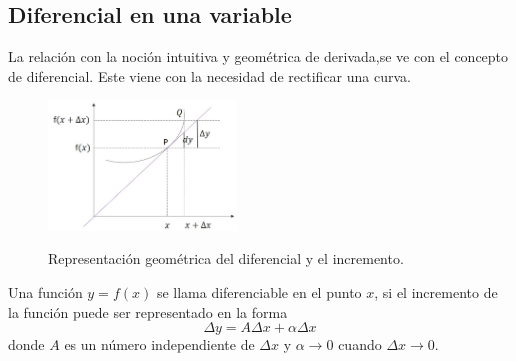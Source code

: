 \documentclass[10pt,twoside]{SelfArx} %
\begin{document}
 \subsection{Diferencial en una variable}
  La relación con la noción intuitiva y geométrica de derivada,se ve con el concepto de diferencial. 
  Este viene con la necesidad de rectificar una curva.\\
\begin{figure}[h]
	\centering
	\includegraphics[width=5cm]{curva_diferencial}
	\label{curva_diferencial}
	\caption{Representación geométrica del diferencial y el incremento.}
\end{figure}
\begin{thm}
	Una función $ y=f(x) $ se llama diferenciable en el punto $ x $, si el incremento de la función puede ser representado en la forma
	\begin{equation}
	\Delta y=A\Delta x+\alpha\Delta x\label{diferencial}
	\end{equation}
	donde $ A $ es un número independiente de $ \Delta x $ y $ \alpha\rightarrow0 $ cuando $ \Delta x\rightarrow0 $.
\end{thm}  
\end{document}
